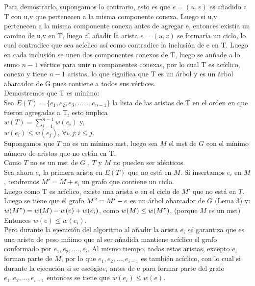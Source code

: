 \documentclass[12pt]{article}
\begin{document}
Para demostrarlo,  supongamos lo contrario, esto es que $e = (u,v)$ es a\~nadido a T con u,v que pertenecen a la misma componente conexa.  Luego
si u,v pertenecen a la misma componente conexa antes de agregar e, entonces exist\'ia un camino de u,v en T, luego al a\~nadir la arista
$e = (u, v)$ se formar\'ia un ciclo, lo cual contradice que sea ac\'iclico as\'i como contradice la inclusi\'on de e en T.  Luego en cada inclusi\'on 
se unen dos componentes conexos de T, luego se an\~nade a lo sumo $n - 1$ v\'ertice para unir n componentes conexas, por lo cual T es 
ac\'iclico, conexo y tiene $n-1$ aristas, lo que significa que T es un \'arbol y es un \'arbol
abarcador de G pues contiene a todos sus v\'ertices.\\



Demostremos que T es m\'inimo:\\

Sea $E (T) = \{e_1, e_2, e_3,......, e_{n-1}\}$ la lista de las aristas de T en el orden en que fueron agregadas a T, esto implica \\
$w (T) = \sum\limits_{i=1}^{n-1}w(e_i)$ y,\\
$w (e_i)  \leq w( e_j)$, $\forall i,j : i \leq j$.\\

Supongamos que $T$ no es un m\'inimo mst, luego sea $M$ el mst de $G$ con el m\'inimo n\'umero de aristas que no est\'an en T.\\

Como $T$ no es un mst de $G$ , $T$ y $M$ no pueden ser id\'enticos. \\

Sea ahora $e_i$ la primera arista en $E (T)$ que no est\'a en $M$. Si insertamos $e_i$ en $M$, tendremos $M'= M + {e_i}$ un grafo que contiene un ciclo.\\
Luego como T es ac\'iclico, existe una arista e en el ciclo de $M'$ que no est\'a en $T$.  Luego se tiene que el grafo $M" = M' - {e}$ es un \'arbol abarcador
 de $G$ (Lema 3) y:\\

$ w(M") = w(M) - w(e) + w(e_i)$, como $w(M) \leq w(M")$, (porque $M$ es un mst)\\
Entonces $w(e) \leq w(e_i)$.\\

Pero durante la ejecuci\'on del algoritmo al a\~nadir la arista $e_i$ se garantiza que es una arista de peso m\'nimo que al ser a\~nadida mantiene
ac\'iclico el grafo conformado por ${e_1, e_2, ...., e_i}$. Al mismo tiempo, todas estas aristas, excepto $e_i$ forman parte de $M$, por lo que ${e_1, e_2,..., e_{i - 1}}$
es tambi\'en ac\'iclico, con lo cual si durante la ejecuci\'on si se escogi\o $e_i$ antes de e para formar parte del grafo ${e_1, e_2,..., e_{i - 1}}$ entonces
se tiene que $w(e_i) \leq w(e)$.\\
\end{document}
